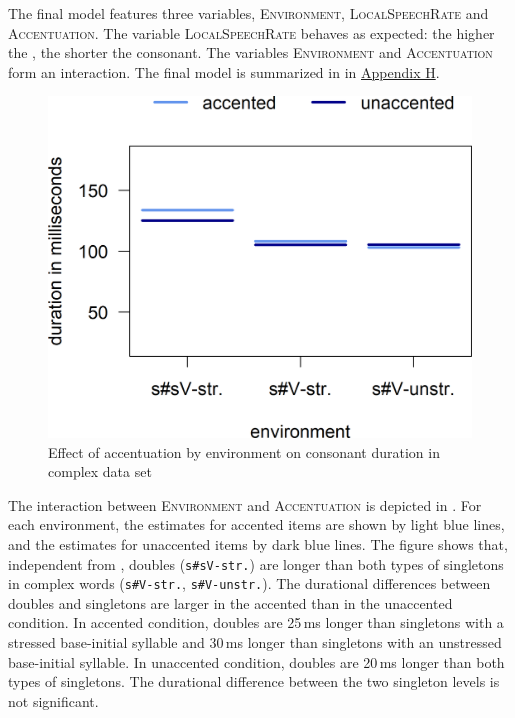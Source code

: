The final model features three variables, \textsc{Environment}, \textsc{LocalSpeechRate} and \textsc{Accentuation}. The variable \textsc{LocalSpeechRate} behaves as expected: the higher the , the shorter the consonant. The variables \textsc{Environment} and \textsc{Accentuation} form an interaction. The final model is summarized in  in \hyperref[Appendix H: Model Summaries Experiment]{Appendix H}.

\begin{figure}[b]
\includegraphics [scale=0.5] {images/Experiment/DisModelInterEnvAcc}
\caption{Effect of accentuation by environment on consonant duration in complex data set}
\label{fig:NumNasal disComplex experiment}
\end{figure}

The interaction between \textsc{Environment} and \textsc{Accentuation} is depicted in . For each environment, the estimates for accented items are shown by light blue lines, and the estimates for unaccented items by dark blue lines.
The figure shows that,  
independent from , doubles (\texttt{s\#sV-str.}) are longer than both types of singletons in complex words (\texttt{s\#V-str.}, \texttt{s\#V-unstr.}). The durational differences between doubles and singletons are larger in the accented than in the unaccented condition. 
In accented condition, doubles are 25\,ms longer than singletons with a stressed base-initial syllable and 30\,ms longer than singletons with an unstressed base-initial syllable. 
In unaccented condition, doubles are 20\,ms longer than both types of singletons. 
The durational difference between the two singleton levels is not significant.

